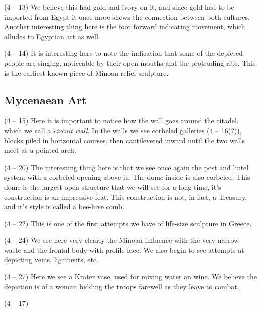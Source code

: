 \documentclass{article}
\begin{document}
    \begin{spacing}{1.2}
    \newpage
    (4 -- 13) We believe this had gold and ivory on it, and since gold had to be imported from Egypt it once more shows the connection between both cultures. Another interesting thing here is the foot forward indicating movement, which alludes to Egyptian art as well.

    (4 -- 14) It is interesting here to note the indication that some of the depicted people are singing, noticeable by their open mouths and the protruding ribs. This is the earliest known piece of Minoan relief sculpture.

    \subsection{Mycenaean Art}
    
    (4 -- 15) Here it is important to notice how the wall goes around the citadel. which we call a \emph{circuit wall}. In the walls we see corbeled galleries (4 -- 16(?)), blocks piled in horizontal courses, then cantilevered inward until the two walls meet as a pointed arch.

    (4 -- 20) The interesting thing here is that we see once again the post and lintel system with a corbeled opening above it. The dome inside is also corbeled. This dome is the largest open structure that we will see for a long time, it's construction is an impressive feat. This construction is not, in fact, a Treasury, and it's style is called a bee-hive comb.

    (4 -- 22) This is one of the first attempts we have of life-size sculpture in Greece.
    
    (4 -- 24) We see here very clearly the Minoan influence with the very narrow waste and the frontal body with profile face. We also begin to see attempts at depicting veins, ligaments, etc.

    (4 -- 27) Here we see a Krater vase, used for mixing water an wine. We believe the depiction is of a woman bidding the troops farewell as they leave to combat. 

    (4 -- 17) 

\end{spacing}
    
\end{document}
